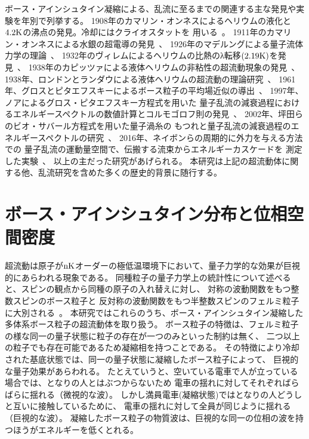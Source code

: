 \documentclass[12pt,a4paper]{jbook}
\begin{document}
		ボース・アインシュタイン凝縮による、乱流に至るまでの関連する主な発見や実験を年別で列挙する。
		1908年のカマリン・オンネスによるヘリウムの液化と$4.2{\rm K}$の沸点の発見。冷却にはクライオスタットを
        用いる~\cite{Onnes1}。
        1911年のカマリン・オンネスによる水銀の超電導の発見~\cite{Onnes2}、
        1926年のマデルングによる量子流体力学の理論~\cite{Madelung1,Madelung2}、
        1932年のヴィレムによるヘリウムの比熱のλ転移$(2.19{\rm K})$を発見~\cite{Willem}、
        1938年のカピッツァによる液体ヘリウムの非粘性の超流動現象の発見~\cite{Kapitza}、
        1938年、ロンドンとランダウによる液体ヘリウムの超流動の理論研究~\cite{London}、
        1961年、グロスとピタエフスキーによるボース粒子の平均場近似の導出~\cite{Gross,Pitaevskii1}、
        1997年、ノアによるグロス・ピタエフスキー方程式を用いた
        量子乱流の減衰過程におけるエネルギースペクトルの数値計算とコルモゴロフ則の発見~\cite{Nore}、
        2002年、坪田らのビオ・サバール方程式を用いた量子渦糸の
        もつれと量子乱流の減衰過程のエネルギースペクトルの研究~\cite{Araki}、
        2016年、ネイボンらの周期的に外力を与える方法での
        量子乱流の運動量空間で、伝搬する流束からエネルギーカスケードを
        測定した実験~\cite{Navon}、
		以上の主だった研究があげられる。
        本研究は上記の超流動体に関する他、乱流研究を含めた多くの歴史的背景に随行する。


		\section{ボース・アインシュタイン分布と位相空間密度}
		超流動は原子が${\rm nK}$オーダーの極低温環境下において、量子力学的な効果が巨視的にあらわれる現象である。
		同種粒子の量子力学上の統計性について述べると、スピンの観点から同種の原子の入れ替えに対し、
        対称の波動関数をもつ整数スピンのボース粒子と
		反対称の波動関数をもつ半整数スピンのフェルミ粒子に大別される~\cite{Fermi,Dirac}。
		本研究ではこれらのうち、ボース・アインシュタイン凝縮した多体系ボース粒子の超流動体を取り扱う。
		ボース粒子の特徴は、フェルミ粒子の様な同一の量子状態に粒子の存在が一つのみといった制約は無く、
		二つ以上の粒子でも存在可能であるため凝縮相を持つことである。
		その特徴により冷却された基底状態では、同一の量子状態に凝縮したボース粒子によって、
        巨視的な量子効果があらわれる。
        たとえていうと、空いている電車で人が立っている場合では、となりの人とはぶつからないため
        電車の揺れに対してそれぞればらばらに揺れる（微視的な波）。
        しかし満員電車(凝縮状態)ではとなりの人どうしと互いに接触しているために、
        電車の揺れに対して全員が同じように揺れる（巨視的な波）。
        凝縮したボース粒子の物質波は、巨視的な同一の位相の波を持つほうがエネルギーを低くとれる。
\end{document}
